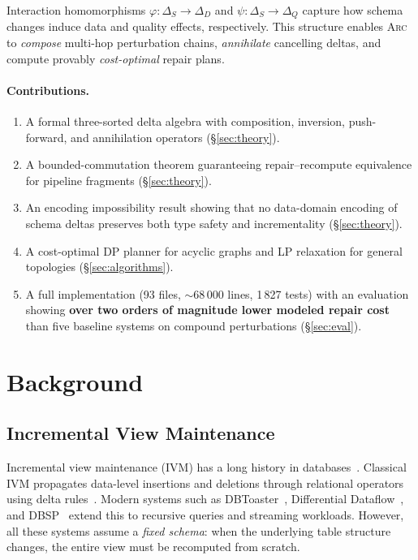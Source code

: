 \documentclass[sigplan,screen,nonacm]{acmart}
\newcommand{\arc}{\textsc{Arc}\xspace}
\newcommand{\DeltaS}{\Delta_{\!S}}
\newcommand{\DeltaD}{\Delta_{\!D}}
\newcommand{\DeltaQ}{\Delta_{\!Q}}
\begin{document}
Interaction homomorphisms $\varphi\colon \DeltaS \to \DeltaD$ and
$\psi\colon \DeltaS \to \DeltaQ$ capture how schema changes induce data
and quality effects, respectively.  This structure enables \arc to
\emph{compose} multi-hop perturbation chains, \emph{annihilate} cancelling
deltas, and compute provably \emph{cost-optimal} repair plans.

\paragraph{Contributions.}
\begin{enumerate}
\item A formal three-sorted delta algebra with composition, inversion,
  push-forward, and annihilation operators (\S\ref{sec:theory}).
\item A bounded-commutation theorem guaranteeing repair--recompute
  equivalence for pipeline fragments (\S\ref{sec:theory}).
\item An encoding impossibility result showing that no data-domain
  encoding of schema deltas preserves both type safety and incrementality
  (\S\ref{sec:theory}).
\item A cost-optimal DP planner for acyclic graphs and LP relaxation for
  general topologies (\S\ref{sec:algorithms}).
\item A full implementation (93 files, $\sim$68\,000 lines, 1\,827 tests)
  with an evaluation showing \textbf{over two orders of magnitude lower modeled
  repair cost} than five baseline systems on compound perturbations
  (\S\ref{sec:eval}).
\end{enumerate}

\section{Background}\label{sec:background}

\subsection{Incremental View Maintenance}

Incremental view maintenance (IVM) has a long history in
databases~\cite{gupta1995maintenance}.  Classical IVM propagates data-level
insertions and deletions through relational operators using delta
rules~\cite{griffin1997improved}.  Modern systems such as
DBToaster~\cite{koch2014dbtoaster}, Differential
Dataflow~\cite{mcsherry2013differential}, and
DBSP~\cite{budiu2023dbsp} extend this to recursive queries and streaming
workloads.  However, all these systems assume a \emph{fixed schema}: when the
underlying table structure changes, the entire view must be recomputed from
scratch.
\end{document}
